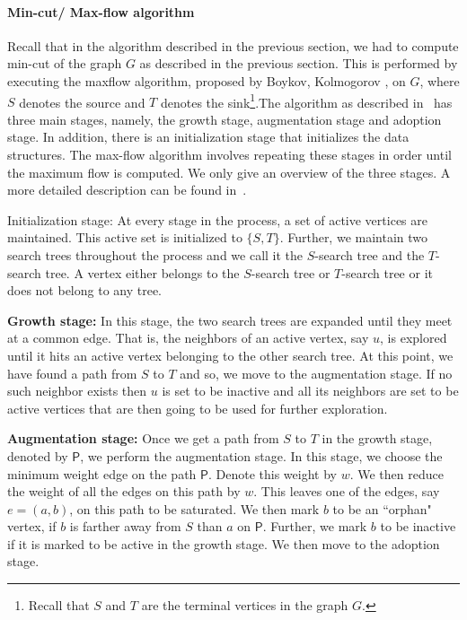 \documentclass{acm}
\newcommand{\pathgraph}{\mathsf{P}}
\begin{document}
\paragraph{Min-cut/ Max-flow algorithm} Recall that in the algorithm described in the previous section, we had to compute min-cut of the graph $G$ as described in the previous section. This is performed by executing the maxflow algorithm, proposed by Boykov, Kolmogorov \cite{BK01}, on $G$, where $S$ denotes the source and $T$ denotes the sink\footnote{Recall that $S$ and $T$ are the terminal vertices in the graph $G$.}.The algorithm as described in~\cite{BK01} has three main stages, namely, the growth stage, augmentation stage and adoption stage. In addition, there is an initialization stage that initializes the data structures. The max-flow algorithm involves repeating these stages in order until the maximum flow is computed. We only give an overview of the three stages. A more detailed description can be found in~\cite{BK01}. 

\noindent Initialization stage: At every stage in the process, a set of active vertices are maintained. This active set is initialized to $\{S,T\}$. Further, we maintain two search trees throughout the process and we call it the $S$-search tree and the $T$-search tree. A vertex either belongs to the $S$-search tree or $T$-search tree or it does not belong to any tree. 

\noindent \textbf{Growth stage:} In this stage, the two search trees are expanded until they meet at a common edge. That is, the neighbors of an active vertex, say $u$, is explored until it hits an active vertex belonging to the other search tree. At this point, we have found a path from $S$ to $T$ and so, we move to the augmentation stage. If no such neighbor exists then $u$ is set to be inactive and all its neighbors are set to be active vertices that are then going to be used for further exploration. 

\noindent \textbf{Augmentation stage:} Once we get a path from $S$ to $T$ in the growth stage, denoted by $\pathgraph$, we perform the augmentation stage. In this stage, we choose the minimum weight edge on the path $\pathgraph$. Denote this weight by $w$. We then reduce the weight of all the edges on this path by $w$. This leaves one of the edges, say $e=(a,b)$, on this path to be saturated. We then mark $b$ to be an ``orphan" vertex, if $b$ is farther away from $S$ than $a$ on $\pathgraph$. Further, we mark $b$ to be inactive if it is marked to be active in the growth stage. We then move to the adoption stage. 
\end{document}
